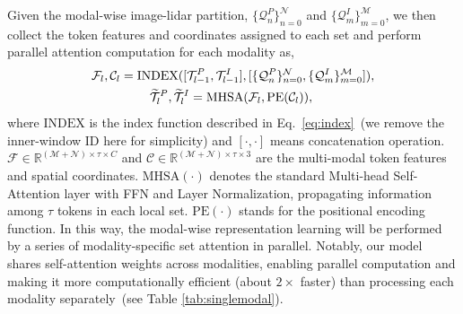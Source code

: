 \documentclass[10pt,twocolumn,letterpaper]{article}
\begin{document}
Given the modal-wise image-lidar partition, $\{\mathcal{Q}^P_n\}_{n=0}^{\mathcal{N}}$ and $\{\mathcal{Q}^I_m\}_{m=0}^{\mathcal{M}}$, we then collect the token features and coordinates assigned to each set and perform parallel attention computation for each modality as,
\vspace{-3pt}
\begin{equation}
    \begin{aligned}
    &\mathcal{F}_{l}, \mathcal{C}_{l} = \text{INDEX}([\mathcal{T}^P_{l-1}, \mathcal{T}^I_{l-1}], [\{\mathcal{Q}^P_n\}_{n\text{=}0}^{\mathcal{N}}, \{\mathcal{Q}^I_m\}_{m\text{=}0}^{\mathcal{M}}]), \\
    &~~~~~~~~~~~~~~\widetilde{\mathcal{T}}^P_{l}, \widetilde{\mathcal{T}}^I_{l} = \text{MHSA}(\mathcal{F}_{l}, \text{PE}(\mathcal{C}_{l})), \\
    \end{aligned}
    \vspace{-5pt}
\end{equation}
where $\text{INDEX}$ is the index function described in Eq.~\eqref{eq:index}~(we remove the inner-window ID here for simplicity) and $[\cdot, \cdot]$ means concatenation operation. $\mathcal{F} \in \mathbb{R}^{(\mathcal{M} + \mathcal{N}) \times \tau \times C}$ and $\mathcal{C} \in \mathbb{R}^{(\mathcal{M} + \mathcal{N}) \times \tau \times 3} $ are the multi-modal token features and spatial coordinates. $\text{MHSA}(\cdot)$ denotes the standard Multi-head Self-Attention layer with FFN and Layer Normalization, propagating information among $\tau$ tokens in each local set. $\text{PE}(\cdot)$ stands for the positional encoding function. In this way, the modal-wise representation learning will be performed by a series of modality-specific set attention in parallel. Notably, our model shares self-attention weights across modalities, enabling parallel computation and making it more computationally efficient (about $2 \times$ faster) than processing each modality separately~(see Table \ref{tab:singlemodal}).
\end{document}
